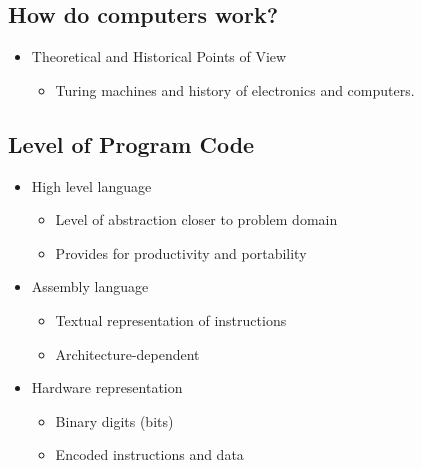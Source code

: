 \documentclass[10pt]{article}
\begin{document}
\subsection*{How do computers work?}
\begin{itemize}
    \item Theoretical and Historical Points of View
    \begin{itemize}
        \item Turing machines and history of electronics and computers.
    \end{itemize}
\end{itemize}
\subsection*{Level of Program Code}
\begin{itemize}
    \item High level language
    \begin{itemize}
        \item Level of abstraction closer to problem domain
        \item Provides for productivity and portability
    \end{itemize}
    \item Assembly language
    \begin{itemize}
        \item Textual representation of instructions
        \item Architecture-dependent
    \end{itemize}
    \item Hardware representation
    \begin{itemize}
        \item Binary digits (bits)
        \item Encoded instructions and data
    \end{itemize}
\end{itemize}
\end{document}
